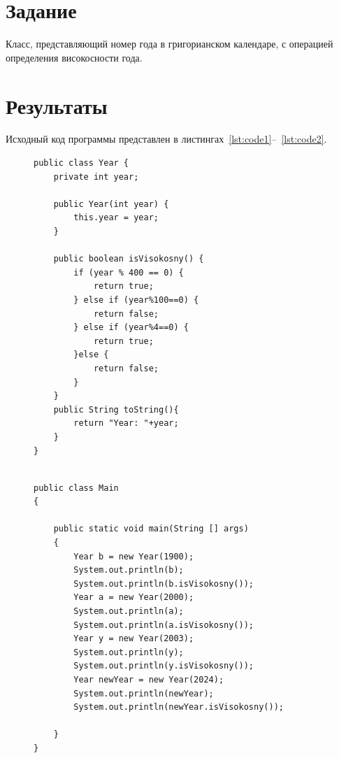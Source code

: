 \documentclass[a4paper, 14pt]{extarticle}
\begin{document}
\renewcommand{\ttdefault}{pcr}

\setlength{\tabcolsep}{3pt}
\newpage
\setcounter{page}{2}

\section{Задание}\label{Sect::task}

Класс, представляющий номер года в григорианском
календаре, с операцией определения високосности года.

\section{Результаты}\label{Sect::res}

Исходный код программы представлен в листингах~\ref{lst:code1}--~\ref{lst:code2}.

\begin{figure}[!htb]
\begin{lstlisting}[language={},caption={Класс Year, в котором реализованы атрибут year, и метод isVisokosny, который проверянт високосный ли год},label={lst:code1}]
public class Year {
    private int year;

    public Year(int year) {
        this.year = year;
    }

    public boolean isVisokosny() {
        if (year % 400 == 0) {
            return true;
        } else if (year%100==0) {
            return false;
        } else if (year%4==0) {
            return true;
        }else {
            return false;
        }
    }
    public String toString(){
        return "Year: "+year;
    }
}


\end{lstlisting}
\end{figure}

\newpage

\begin{figure}[!htb]
\begin{lstlisting}[language={},caption={Класс Main, в котором реализована проверка работы класса Year},label={lst:code2}]
    public class Main
{

    public static void main(String [] args)
    {
        Year b = new Year(1900);
        System.out.println(b);
        System.out.println(b.isVisokosny());
        Year a = new Year(2000);
        System.out.println(a);
        System.out.println(a.isVisokosny());
        Year y = new Year(2003);
        System.out.println(y);
        System.out.println(y.isVisokosny());
        Year newYear = new Year(2024);
        System.out.println(newYear);
        System.out.println(newYear.isVisokosny());

    }
}
\end{lstlisting}
\end{figure}
\end{document}
